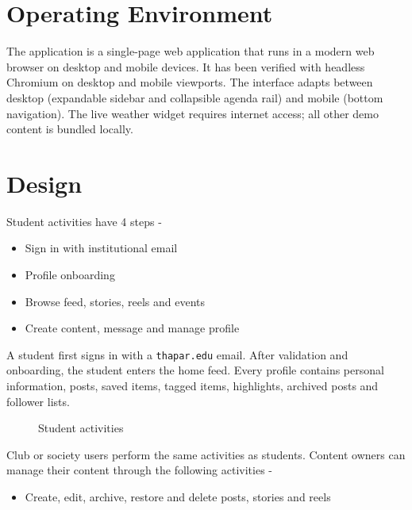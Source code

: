 \documentclass{scrreprt}
\begin{document}
\section{Operating Environment}
The application is a single-page web application that runs in a modern web browser on desktop and mobile devices. It has been verified with headless Chromium on desktop and mobile viewports. The interface adapts between desktop (expandable sidebar and collapsible agenda rail) and mobile (bottom navigation). The live weather widget requires internet access; all other demo content is bundled locally.

\section{Design}
Student activities have 4 steps -
\begin{itemize}
    \item Sign in with institutional email
    \item Profile onboarding
    \item Browse feed, stories, reels and events
    \item Create content, message and manage profile
\end{itemize}
A student first signs in with a \texttt{thapar.edu} email. After validation and onboarding, the student enters the home feed. Every profile contains personal information, posts, saved items, tagged items, highlights, archived posts and follower lists.
\begin{figure}[h!]
\centering
{}
\caption{Student activities}
\label{fig:studentact}
\end{figure}
\newline
Club or society users perform the same activities as students.
\newline
Content owners can manage their content through the following activities -
\begin{itemize}
    \item Create, edit, archive, restore and delete posts, stories and reels
\end{itemize}
\end{document}
